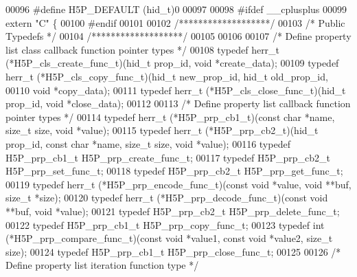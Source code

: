 \begin{DoxyCode}
00096 \textcolor{preprocessor}{#define H5P\_DEFAULT     (hid\_t)0}
00097 
00098 \textcolor{preprocessor}{#ifdef \_\_cplusplus}
00099 \textcolor{keyword}{extern} \textcolor{stringliteral}{"C"} \{
00100 \textcolor{preprocessor}{#endif}
00101 
00102 \textcolor{comment}{/*******************/}
00103 \textcolor{comment}{/* Public Typedefs */}
00104 \textcolor{comment}{/*******************/}
00105 
00106 
00107 \textcolor{comment}{/* Define property list class callback function pointer types */}
00108 \textcolor{keyword}{typedef} herr\_t (*H5P\_cls\_create\_func\_t)(hid\_t prop\_id, \textcolor{keywordtype}{void} *create\_data);
00109 \textcolor{keyword}{typedef} herr\_t (*H5P\_cls\_copy\_func\_t)(hid\_t new\_prop\_id, hid\_t old\_prop\_id,
00110                                       \textcolor{keywordtype}{void} *copy\_data);
00111 \textcolor{keyword}{typedef} herr\_t (*H5P\_cls\_close\_func\_t)(hid\_t prop\_id, \textcolor{keywordtype}{void} *close\_data);
00112 
00113 \textcolor{comment}{/* Define property list callback function pointer types */}
00114 \textcolor{keyword}{typedef} herr\_t (*H5P\_prp\_cb1\_t)(\textcolor{keyword}{const} \textcolor{keywordtype}{char} *name, \textcolor{keywordtype}{size\_t} size, \textcolor{keywordtype}{void} *value);
00115 \textcolor{keyword}{typedef} herr\_t (*H5P\_prp\_cb2\_t)(hid\_t prop\_id, \textcolor{keyword}{const} \textcolor{keywordtype}{char} *name, \textcolor{keywordtype}{size\_t} size, \textcolor{keywordtype}{void} *value);
00116 \textcolor{keyword}{typedef} H5P\_prp\_cb1\_t H5P\_prp\_create\_func\_t;
00117 \textcolor{keyword}{typedef} H5P\_prp\_cb2\_t H5P\_prp\_set\_func\_t;
00118 \textcolor{keyword}{typedef} H5P\_prp\_cb2\_t H5P\_prp\_get\_func\_t;
00119 \textcolor{keyword}{typedef} herr\_t (*H5P\_prp\_encode\_func\_t)(\textcolor{keyword}{const} \textcolor{keywordtype}{void} *value, \textcolor{keywordtype}{void} **buf, \textcolor{keywordtype}{size\_t} *size);
00120 \textcolor{keyword}{typedef} herr\_t (*H5P\_prp\_decode\_func\_t)(\textcolor{keyword}{const} \textcolor{keywordtype}{void} **buf, \textcolor{keywordtype}{void} *value);
00121 \textcolor{keyword}{typedef} H5P\_prp\_cb2\_t H5P\_prp\_delete\_func\_t;
00122 \textcolor{keyword}{typedef} H5P\_prp\_cb1\_t H5P\_prp\_copy\_func\_t;
00123 \textcolor{keyword}{typedef} int (*H5P\_prp\_compare\_func\_t)(\textcolor{keyword}{const} \textcolor{keywordtype}{void} *value1, \textcolor{keyword}{const} \textcolor{keywordtype}{void} *value2, \textcolor{keywordtype}{size\_t} size);
00124 \textcolor{keyword}{typedef} H5P\_prp\_cb1\_t H5P\_prp\_close\_func\_t;
00125 
00126 \textcolor{comment}{/* Define property list iteration function type */}

\end{DoxyCode}
